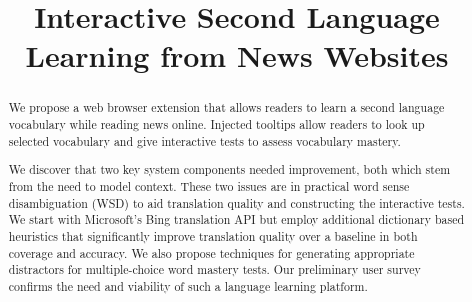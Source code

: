 \documentclass[11pt]{article}
\title{Interactive Second Language Learning from News Websites}
\date{}
\begin{document}
\maketitle
\begin{abstract}


We propose a web browser extension that allows readers to learn a
second language vocabulary while reading news online.  Injected
tooltips allow readers to look up selected vocabulary and give
interactive tests to assess vocabulary mastery.  

We discover that two key system components needed improvement, both
which stem from the need to model context.  These two issues are in
practical word sense disambiguation (WSD) to aid translation quality
and constructing the interactive tests. We start with Microsoft's Bing
translation API but employ additional dictionary based heuristics that
significantly improve translation quality over a baseline in both
coverage and accuracy. We also propose techniques for generating
appropriate distractors for multiple-choice word mastery tests.  Our
preliminary user survey confirms the need and viability of such a
language learning platform.

\end{abstract}









%
%



\end{document}
